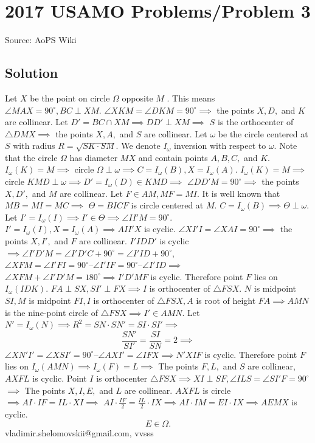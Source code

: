 \documentclass[12pt]{article}
\begin{document}
\section*{{2017 USAMO Problems/Problem 3}}
Source: AoPS Wiki

\subsection*{Solution}
Let $X$ be the point on circle $\Omega$ opposite $M$ . This means $\angle MAX = 90^\circ, BC \perp XM.$ $\angle XKM = \angle DKM = 90^\circ \implies$ the points $X, D,$ and $K$ are collinear. Let $D' = BC \cap XM \implies DD' \perp XM \implies$ $S$ is the orthocenter of $\triangle DMX \implies$ the points $X, A,$ and $S$ are collinear. Let $\omega$ be the circle centered at $S$ with radius $R = \sqrt {SK \cdot SM}.$ We denote $I_\omega$ inversion with respect to $\omega.$ Note that the circle $\Omega$ has diameter $MX$ and contain points $A, B, C,$ and $K.$ $I_\omega (K) = M \implies$ circle $\Omega \perp \omega \implies C = I_\omega (B), X = I_\omega (A).$ $I_\omega (K) = M \implies$ circle $KMD \perp \omega \implies D' = I_\omega (D) \in KMD \implies$ $\angle DD'M = 90^\circ \implies$ the points $X, D',$ and $M$ are collinear. Let $F \in AM, MF = MI.$ It is well known that $MB = MI = MC \implies$ $\Theta = BICF$ is circle centered at $M.$ $C = I_\omega (B) \implies \Theta \perp \omega.$ Let $I' = I_\omega (I ) \implies I' \in \Theta \implies \angle II'M = 90^\circ.$ $I' = I_\omega (I ), X = I_\omega (A ) \implies AII'X$ is cyclic. $\angle XI'I = \angle XAI = 90^\circ \implies$ the points $X, I' ,$ and $F$ are collinear. $I'IDD'$ is cyclic $\implies \angle I'D'M = \angle I'D'C + 90^\circ = \angle I'ID + 90^\circ,$ $\angle XFM = \angle I'FI = 90^\circ – \angle I'IF = 90^\circ – \angle I'ID \implies$ $\angle XFM + \angle I'D'M = 180^\circ \implies I'D'MF$ is cyclic. Therefore point $F$ lies on $I_\omega (IDK).$ $FA \perp SX, SI' \perp FX \implies I$ is orthocenter of $\triangle FSX.$ $N$ is midpoint $SI, M$ is midpoint $FI, I$ is orthocenter of $\triangle FSX, A$ is root of height $FA \implies AMN$ is the nine-point circle of $\triangle FSX \implies I' \in AMN.$ Let $N' = I_\omega (N) \implies R^2 = SN \cdot SN' = SI \cdot SI' \implies$ \[\frac {SN'}{SI'} = \frac {SI}{SN} =2 \implies\] $\angle XN'I' = \angle XSI' = 90^\circ – \angle AXI' = \angle IFX \implies N'XIF$ is cyclic. Therefore point $F$ lies on $I_\omega (AMN) \implies I_\omega(F) = L \implies$ The points $F, L,$ and $S$ are collinear, $AXFL$ is cyclic. Point $I$ is orthocenter $\triangle FSX \implies XI \perp SF, \angle ILS = \angle SI'F = 90^\circ$ $\implies$ The points $X, I, E,$ and $L$ are collinear. $AXFL$ is circle $\implies AI \cdot IF = IL \cdot XI\implies$ $AI \cdot \frac {IF}{2} = \frac {IL}{2} \cdot IX \implies AI \cdot IM = EI \cdot IX \implies AEMX$ is cyclic. \[E \in \Omega.\] vladimir.shelomovskii@gmail.com, vvsss
\end{document}
